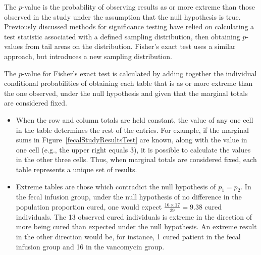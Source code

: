 \textD{\newpage}

The $p$-value is the probability of observing results as or more extreme than those observed in the study under  the assumption that the null hypothesis is true. Previously discussed methods for significance testing have relied on calculating a test statistic associated with a defined sampling distribution, then obtaining $p$-values from tail areas on the distribution.  Fisher's exact test uses a similar approach, but introduces a new sampling distribution.

The $p$-value for Fisher's exact test is calculated by adding together the individual conditional probabilities of obtaining each table that is as or more extreme than the one observed, under the null hypothesis and given that the marginal totals are considered fixed.

\begin{itemize}

	\item When the row and column totals are held constant, the value of any one cell in the table determines the rest of the entries. For example, if the marginal sums in Figure~\ref{fecalStudyResultsTest} are known, along with the value in one cell (e.g., the upper right equals 3), it is possible to calculate the values in the other three cells. Thus, when marginal totals are considered fixed, each table represents a unique set of results.

	\item Extreme tables are those which contradict the null hypothesis of $p_1 = p_2$. In the fecal infusion group, under the null hypothesis of no difference in the population proportion cured, one would expect $\frac{16 \times 17}{29} = 9.38$ cured individuals. The 13 observed cured individuals is extreme in the direction of more being cured than expected under the null hypothesis. An extreme result in the other direction would be, for instance, 1 cured patient in the fecal infusion group and 16 in the vancomycin group.

\end{itemize}

